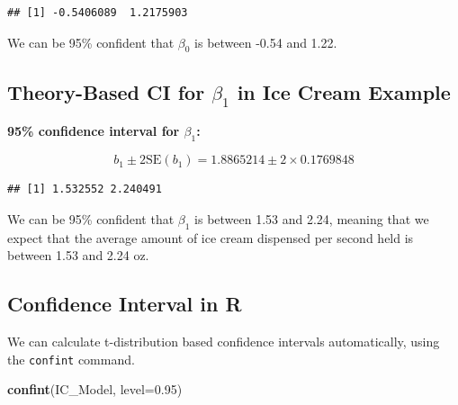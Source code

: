 \documentclass[]{book}
\newenvironment{Shaded}{\begin{snugshade}}{\end{snugshade}}
\newcommand{\KeywordTok}[1]{\textcolor[rgb]{0.13,0.29,0.53}{\textbf{#1}}}
\newcommand{\DataTypeTok}[1]{\textcolor[rgb]{0.13,0.29,0.53}{#1}}
\newcommand{\DecValTok}[1]{\textcolor[rgb]{0.00,0.00,0.81}{#1}}
\newcommand{\FloatTok}[1]{\textcolor[rgb]{0.00,0.00,0.81}{#1}}
\newcommand{\StringTok}[1]{\textcolor[rgb]{0.31,0.60,0.02}{#1}}
\newcommand{\OperatorTok}[1]{\textcolor[rgb]{0.81,0.36,0.00}{\textbf{#1}}}
\newcommand{\NormalTok}[1]{#1}
\begin{document}
\begin{verbatim}
## [1] -0.5406089  1.2175903
\end{verbatim}

We can be 95\% confident that \(\beta_0\) is between -0.54 and 1.22.

\subsection{\texorpdfstring{Theory-Based CI for \(\beta_1\) in Ice Cream
Example}{Theory-Based CI for \textbackslash{}beta\_1 in Ice Cream Example}}\label{theory-based-ci-for-beta_1-in-ice-cream-example}

\textbf{95\% confidence interval for \(\beta_1\):}

\[
b_1\pm 2\text{SE}(b_1) = 1.8865214 \pm 2 \times 0.1769848
\]

\begin{Shaded}
\end{Shaded}

\begin{verbatim}
## [1] 1.532552 2.240491
\end{verbatim}

We can be 95\% confident that \(\beta_1\) is between 1.53 and 2.24,
meaning that we expect that the average amount of ice cream dispensed
per second held is between 1.53 and 2.24 oz.

\subsection{Confidence Interval in R}\label{confidence-interval-in-r}

We can calculate t-distribution based confidence intervals
automatically, using the \texttt{confint} command.

\begin{Shaded}
\begin{Highlighting}[]
\KeywordTok{confint}\NormalTok{(IC_Model, }\DataTypeTok{level=}\FloatTok{0.95}\NormalTok{)}
\end{Highlighting}
\end{Shaded}
\end{document}
